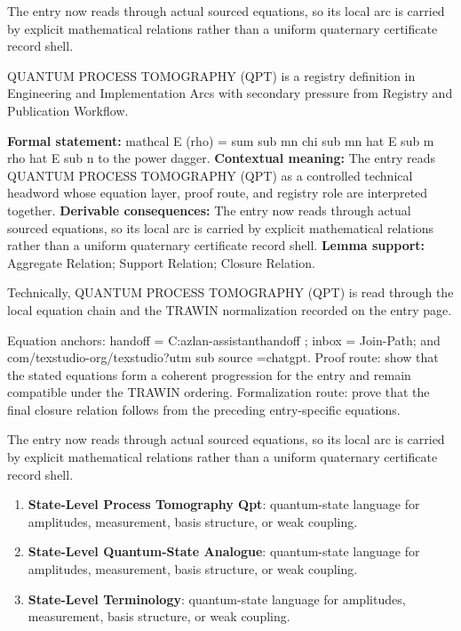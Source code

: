 The entry now reads through actual sourced equations, so its local arc is carried by explicit mathematical relations rather than a uniform quaternary certificate record shell.
\clearpage


\begingroup\small
{}
QUANTUM PROCESS TOMOGRAPHY (QPT) is a registry definition in Engineering and Implementation Arcs with secondary pressure from Registry and Publication Workflow.

\begingroup\footnotesize\setlength{\emergencystretch}{3em}\sloppy
\textbf{Formal statement:} mathcal E (rho) = sum sub mn chi sub mn hat E sub m rho hat E sub n to the power dagger. \textbf{Contextual meaning:} The entry reads QUANTUM PROCESS TOMOGRAPHY (QPT) as a controlled technical headword whose equation layer, proof route, and registry role are interpreted together. \textbf{Derivable consequences:} The entry now reads through actual sourced equations, so its local arc is carried by explicit mathematical relations rather than a uniform quaternary certificate record shell. \textbf{Lemma support:} Aggregate Relation; Support Relation; Closure Relation.\par
\endgroup

Technically, QUANTUM PROCESS TOMOGRAPHY (QPT) is read through the local equation chain and the TRAWIN normalization recorded on the entry page.

Equation anchors: handoff = C:azlan-assistanthandoff ; inbox = Join-Path; and com/texstudio-org/texstudio?utm sub source =chatgpt. Proof route: show that the stated equations form a coherent progression for the entry and remain compatible under the TRAWIN ordering. Formalization route: prove that the final closure relation follows from the preceding entry-specific equations.

The entry now reads through actual sourced equations, so its local arc is carried by explicit mathematical relations rather than a uniform quaternary certificate record shell.
\endgroup

\begin{enumerate}[leftmargin=1.6em,itemsep=6pt,topsep=4pt]
\item \textbf{State-Level Process Tomography Qpt}: quantum-state language for amplitudes, measurement, basis structure, or weak coupling.
\item \textbf{State-Level Quantum-State Analogue}: quantum-state language for amplitudes, measurement, basis structure, or weak coupling.
\item \textbf{State-Level Terminology}: quantum-state language for amplitudes, measurement, basis structure, or weak coupling.
\end{enumerate}

